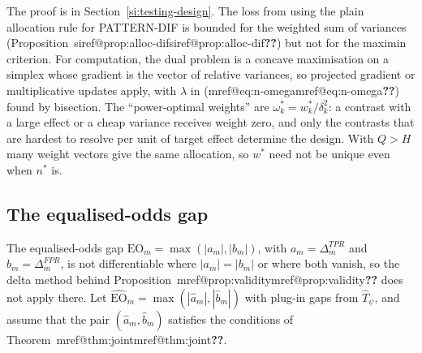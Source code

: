 \documentclass[pdflatex,sn-mathphys-num,iicol]{sn-jnl}
\makeatletter
\theoremstyle{thmstyleone}
\theoremstyle{thmstyletwo}
\theoremstyle{thmstylethree}
\newcommand{\SIref}[1]{\ifcsname siref@#1\endcsname\csname siref@#1\endcsname\else\textbf{??}\fi}
\newcommand{\Mref}[1]{\ifcsname mref@#1\endcsname\csname mref@#1\endcsname\else\textbf{??}\fi}
\makeatother
\begin{document}
The proof is in Section~\ref{si:testing-design}. The loss from using the plain allocation rule for PATTERN-DIF is bounded for the weighted sum of variances (Proposition~\SIref{prop:alloc-dif}) but not for the maximin criterion. For computation, the dual problem is a concave maximisation on a simplex whose gradient is the vector of relative variances, so projected gradient or multiplicative updates apply, with $\lambda$ in (\Mref{eq:n-omega}) found by bisection. The ``power-optimal weights'' are $\omega^\ast_k=w^\ast_k/\delta_k^2$: a contrast with a large effect or a cheap variance receives weight zero, and only the contrasts that are hardest to resolve per unit of target effect determine the design. With $Q>H$ many weight vectors give the same allocation, so $w^\ast$ need not be unique even when $n^\ast$ is.

\subsection{The equalised-odds gap}\label{si:testing-eo-stmt}

The equalised-odds gap $\mathrm{EO}_m=\max(|a_m|,|b_m|)$, with $a_m=\Delta^{TPR}_m$ and $b_m=\Delta^{FPR}_m$, is not differentiable where $|a_m|=|b_m|$ or where both vanish, so the delta method behind Proposition~\Mref{prop:validity} does not apply there. Let $\widehat{\mathrm{EO}}_m=\max(|\hat a_m|,|\hat b_m|)$ with plug-in gaps from $\hat T_\psi$, and assume that the pair $(\hat a_m,\hat b_m)$ satisfies the conditions of Theorem~\Mref{thm:joint}.
\end{document}
